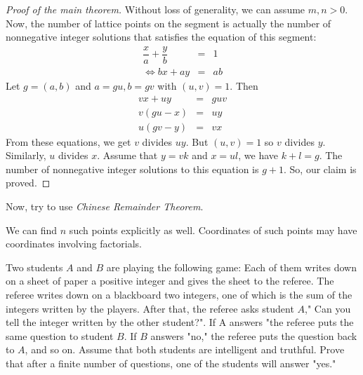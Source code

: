 \documentclass{subfile}
\begin{document}
\begin{hint}
\begin{proof}[Proof of the main theorem]
				Without loss of generality, we can assume $m,n>0$. Now, the number of lattice points on the segment is actually the number of nonnegative integer solutions that satisfies the equation of this segment:
				\begin{eqnarray*}
					\dfrac{x}{a}+\dfrac{y}{b} & = & 1\\
					\iff bx+ay & = & ab
				\end{eqnarray*}
				Let $g=(a,b)$ and $a=gu,b=gv$ with $(u,v)=1$. Then
				\begin{eqnarray*}
					vx+uy & = & guv\\
					v(gu-x) & = & uy\\
					u(gv-y) & = & vx
				\end{eqnarray*}
				From these equations, we get $v$ divides $uy$. But $(u,v)=1$ so $v$ divides $y$. Similarly, $u$ divides $x$. Assume that $y=vk$ and $x=ul$, we have $k+l=g$. The number of nonnegative integer solutions to this equation is $g+1$. So, our claim is proved.
				
			\end{proof}
		Now, try to use \textit{Chinese Remainder Theorem}.
	\end{hint}
	
	\begin{note}
		We can find $n$ such points explicitly as well. Coordinates of such points may have coordinates involving factorials.
	\end{note}
	
	\begin{problem}
		Two students $A$ and $B$ are playing the following game: Each of them writes down on a sheet of paper a positive integer and gives the sheet to the referee. The referee writes down on a blackboard two integers, one of which is the sum of the integers written by the players. After that, the referee asks student $A$," Can you tell the integer written by the other student?". If A answers "the referee puts the same question to student $ B$. If $B$ answers "no," the referee puts the question back to $A$, and so on. Assume that both students are intelligent and truthful. Prove that after a finite number of questions, one of the students will answer "yes."
	\end{problem}
	
\end{document}
